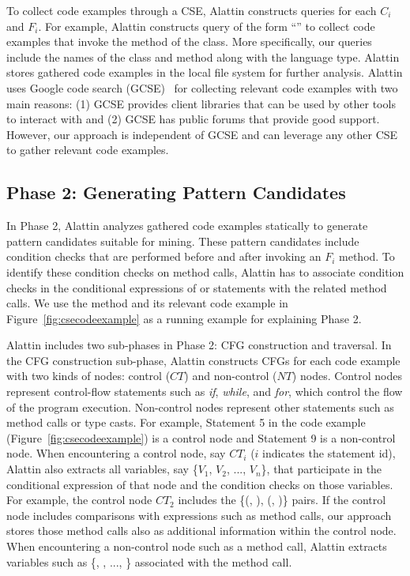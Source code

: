 To collect code examples through a CSE, Alattin constructs queries for each $C_i$ and $F_i$. For example, Alattin constructs query of the form ``'' to collect code examples that invoke the  method of the  class. More specifically, our queries include the names of the class and method along
with the language type. Alattin stores gathered code examples in the local file system for further analysis. 
Alattin uses Google code search (GCSE)~\cite{GCSE} for collecting relevant code examples with two main reasons: (1) GCSE provides client libraries that can be used by other tools to interact with and (2) GCSE has public forums that provide good support. However, our approach is independent of GCSE and can leverage any other CSE to gather relevant code examples.
\subsection {Phase 2: Generating Pattern Candidates}
\label{sec:codeanalyzer}

In Phase 2, Alattin analyzes gathered code examples statically to generate pattern candidates suitable for mining. These pattern candidates include condition checks that are performed before and after invoking an $F_i$ method. To identify these condition checks on method calls, Alattin has to associate condition checks in the conditional expressions of  or  statements with the related method calls. We use the  method and its relevant code example in Figure~\ref{fig:csecodeexample} as a running example for explaining Phase 2. 

Alattin includes two sub-phases in Phase 2: CFG construction and traversal. In the CFG construction sub-phase, Alattin constructs CFGs for each code example with two kinds of nodes: control ($CT$) and non-control ($NT$) nodes. Control nodes represent control-flow statements such as \emph{if}, \emph{while}, and \emph{for}, which control the flow of the program execution. Non-control nodes represent other statements such as method calls or type casts. For example, Statement 5 in the code example (Figure~\ref{fig:csecodeexample}) is a control node and Statement 9 is a non-control node. When encountering a control node, say $CT_i$ ($i$ indicates the statement id), Alattin also extracts all variables, say \{$V_1$, $V_2$, ..., $V_n$\}, that participate in the conditional expression of that node and the condition checks on those variables. For example, the control node $CT_2$ includes the \{(, ), (, )\} pairs. If the control node includes comparisons with expressions such as method calls, our approach stores those method calls also as additional information within the control node. When encountering a non-control node such as a method call, Alattin extracts variables such as \{, , ..., \} associated with the method call.

